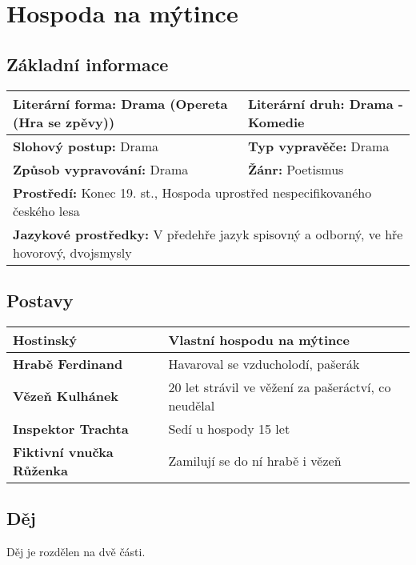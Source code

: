\section{Hospoda na mýtince}
\label{sec:hospodanamytince}
\subsection*{Základní informace}
\begin{tabularx}{\linewidth}{l|l}
  \textbf{Literární forma:} Drama (Opereta (Hra se zpěvy)) & \textbf{Literární druh:} Drama - Komedie                \\
  \hline
  \textbf{Slohový postup:} Drama                           & \textbf{Typ vypravěče:} Drama                           \\
  \hline
  \textbf{Způsob vypravování:} Drama                       & \textbf{Žánr:} Poetismus                                     \\
  \hline
  \multicolumn{2}{l}{\textbf{Prostředí:} Konec 19. st., Hospoda uprostřed nespecifikovaného českého lesa}            \\
  \hline
  \multicolumn{2}{l}{\textbf{Jazykové prostředky:} V předehře jazyk spisovný a odborný, ve hře hovorový, dvojsmysly} \\
\end{tabularx}
\subsection*{Postavy}
\begin{tabularx}{\linewidth}{l|l}
  \textbf{Hostinský}               & Vlastní hospodu na mýtince                          \\
  \hline
  \textbf{Hrabě Ferdinand}         & Havaroval se vzducholodí, pašerák                   \\
  \hline
  \textbf{Vězeň Kulhánek}          & 20 let strávil ve věžení za pašeráctví, co neudělal \\
  \hline
  \textbf{Inspektor Trachta}       & Sedí u hospody 15 let                               \\
  \hline
  \textbf{Fiktivní vnučka Růženka} & Zamilují se do ní hrabě i vězeň                     \\
\end{tabularx}
\subsection*{Děj}
Děj je rozdělen na dvě části.

